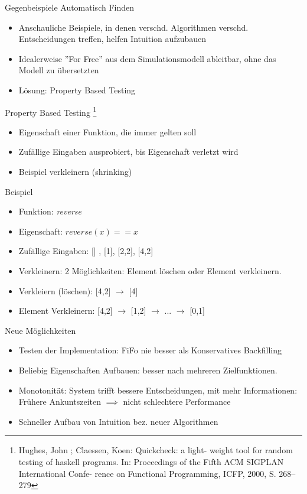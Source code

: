 \documentclass[aspectratio=169,10pt]{beamer}
\begin{document}
\begin{frame}[t,fragile]{Gegenbeispiele Automatisch Finden}
	\begin{itemize}
		\item \alert{Anschauliche} Beispiele, in denen verschd. Algorithmen verschd. Entscheidungen treffen, helfen Intuition aufzubauen
		\item Idealerweise ''For Free'' aus dem Simulationsmodell ableitbar, ohne das Modell zu \"ubersetzten 
		\item L\"osung: \alert{Property Based Testing}
	\end{itemize}
\end{frame}
\begin{frame}[t,fragile]{Property Based Testing \footnote{Hughes, John ; Claessen, Koen: Quickcheck: a light-
		weight tool for random testing of haskell programs. In:
		Proceedings of the Fifth ACM SIGPLAN International Confe-
		rence on Functional Programming, ICFP, 2000, S. 268–279}}
	\begin{itemize}
		\item Eigenschaft einer Funktion, die immer gelten soll
		\item Zuf\"allige Eingaben ausprobiert, bis Eigenschaft verletzt wird
		\item Beispiel verkleinern (shrinking) 
	\end{itemize}
\end{frame}

\begin{frame}[t, fragile]{Beispiel}
\begin{itemize}

	\item Funktion: \emph{reverse}
	\item Eigenschaft: $reverse(x) == x$
	\item Zuf\"allige Eingaben: [] , [1], [2,2], [4,2]\lightning
	\item Verkleinern: 2 M\"oglichkeiten: Element l\"oschen oder Element verkleinern. 
	\item Verkleiern (l\"oschen): [4,2] $\rightarrow$ [4] \lightning
	\item Element Verkleinern: [4,2] $\rightarrow$ [1,2] $\rightarrow$ ... $\rightarrow$ [0,1]
\end{itemize}
\end{frame}

\begin{frame}[t, fragile]{Neue M\"oglichkeiten}
\begin{itemize}
	\item Testen der Implementation: FiFo nie besser als Konservatives Backfilling
	\item Beliebig Eigenschaften Aufbauen: besser nach mehreren Zielfunktionen.
	\item Monotonit\"at: System trifft bessere Entscheidungen, mit mehr Informationen: Fr\"uhere Ankuntszeiten $\implies$ nicht schlechtere Performance
	\item Schneller Aufbau von Intuition bez. neuer Algorithmen
\end{itemize}
\end{frame}
\end{document}
